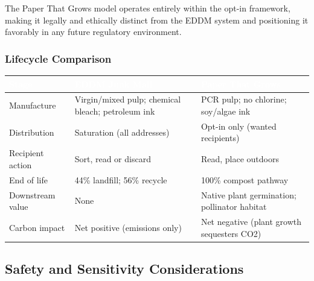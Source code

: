 \documentclass[11pt,letterpaper]{article}
\newcommand{\tableheader}[1]{\textbf{\sffamily\textcolor{white}{#1}}}
\begin{document}
The Paper That Grows model operates entirely within the opt-in framework, making it legally and ethically distinct from the EDDM system and positioning it favorably in any future regulatory environment.

\subsubsection{Lifecycle Comparison}

\begin{center}
\begin{tabularx}{\textwidth}{L{3.5cm}L{3.5cm}L{4cm}}
\toprule
{}
\tableheader{Stage} & \tableheader{EDDM Junk Mail} & \tableheader{Paper That Grows} \\
\midrule
Manufacture & Virgin/mixed pulp; chemical bleach; petroleum ink & PCR pulp; no chlorine; soy/algae ink \\
Distribution & Saturation (all addresses) & Opt-in only (wanted recipients) \\
Recipient action & Sort, read or discard & Read, place outdoors \\
End of life & 44\% landfill; 56\% recycle & 100\% compost pathway \\
Downstream value & None & Native plant germination; pollinator habitat \\
Carbon impact & Net positive (emissions only) & Net negative (plant growth sequesters CO2) \\
\bottomrule
\end{tabularx}
\end{center}

\subsection{Safety and Sensitivity Considerations}
\end{document}
